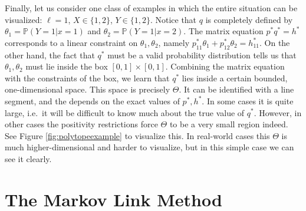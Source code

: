 \vspace{.1in}


\begin{example}
Finally, let us consider one class of examples in which the entire situation can be visualized: $\ell=1$, $X\in \{1,2\}$, $Y\in \{1,2\}$.   Notice that $q$ is completely defined by $\theta_1=\mathbb{P}(Y=1|x=1)$ and $\theta_2=\mathbb{P}(Y=1|x=2)$.  The matrix equation $p^* q^* = h^*$ corresponds to a linear constraint on $\theta_1,\theta_2$, namely $p^*_{11}\theta_1 + p^*_{12}\theta_2 = h^*_{11}$.  On the other hand, the fact that $q^*$ must be a valid probability distribution tells us that $\theta_1,\theta_2$ must lie inside the box $[0,1]\times[0,1]$.   Combining the matrix equation with the constraints of the box, we learn that $q^*$ lies inside a certain bounded, one-dimensional space.  This space is precisely $\Theta$.  It can be identified with a line segment, and the depends on the exact values of $p^*,h^*$.  In some cases it is quite large, i.e.\ it will be difficult to know much about the true value of $q^*$.  However, in other cases the positivity restrictions force $\Theta$ to be a very small region indeed.  See Figure \ref{fig:polytopeexample} to visualize this.  In real-world cases this $\Theta$ is much higher-dimensional and harder to visualize, but in this simple case we can see it clearly.
\end{example}  

\section{The Markov Link Method}

